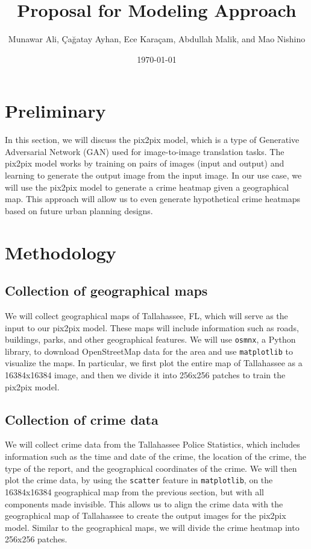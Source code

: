 \documentclass{article}
\title{Proposal for Modeling Approach}
\author{Munawar Ali, Çağatay Ayhan, Ece Karaçam, Abdullah Malik, and Mao Nishino}
\date{\today}
\begin{document}
\maketitle

\section{Preliminary}
In this section, we will discuss the pix2pix model, which is a type of Generative Adversarial Network (GAN) used for image-to-image translation tasks. The pix2pix model works by training on pairs of images (input and output) and learning to generate the output image from the input image. In our use case, we will use the pix2pix model to generate a crime heatmap given a geographical map. This approach will allow us to even generate hypothetical crime heatmaps based on future urban planning designs.

\section{Methodology}
\subsection{Collection of geographical maps}
We will collect geographical maps of Tallahassee, FL, which will serve as the input to our pix2pix model. These maps will include information such as roads, buildings, parks, and other geographical features. We will use \verb|osmnx|, a Python library, to download OpenStreetMap data for the area and use \verb|matplotlib| to visualize the maps. In particular, we first plot the entire map of Tallahassee as a 16384x16384 image, and then we divide it into 256x256 patches to train the pix2pix model.
\subsection{Collection of crime data}
We will collect crime data from the Tallahassee Police Statistics, which includes information such as the time and date of the crime, the location of the crime, the type of the report, and the geographical coordinates of the crime. We will then plot the crime data, by using the \verb|scatter| feature in \verb|matplotlib|, on the 16384x16384 geographical map from the previous section, but with all components made invisible. This allows us to align the crime data with the geographical map of Tallahassee to create the output images for the pix2pix model. Similar to the geographical maps, we will divide the crime heatmap into 256x256 patches.
\end{document}
